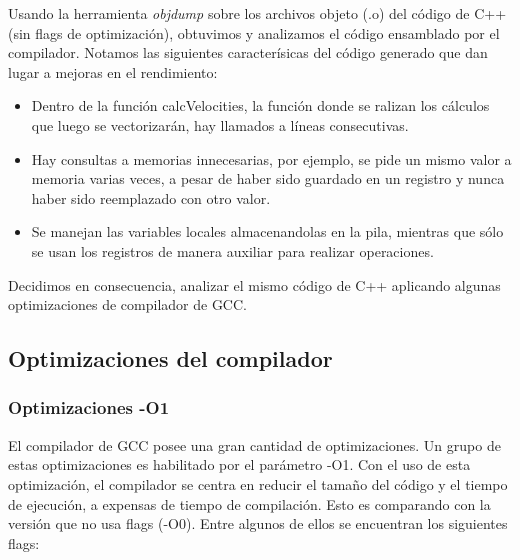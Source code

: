 Usando la herramienta \textit{objdump} sobre los archivos objeto (.o) del código de C++ (sin flags de optimización), obtuvimos y analizamos el código ensamblado por el compilador. Notamos las siguientes caracterísicas del código generado que dan lugar a mejoras en el rendimiento:
\begin{itemize}
	\item Dentro de la función calcVelocities, la función donde se ralizan los cálculos que luego se vectorizarán, hay llamados a líneas consecutivas.
	\item Hay consultas a memorias innecesarias, por ejemplo, se pide un mismo valor a memoria varias veces, a pesar de haber sido guardado en un registro y nunca haber sido reemplazado con otro valor.
	\item Se manejan las variables locales almacenandolas en la pila, mientras que sólo se usan los registros de manera auxiliar para realizar operaciones.
\end{itemize}
Decidimos en consecuencia, analizar el mismo código de C++ aplicando algunas optimizaciones de compilador de GCC.
~\\

\subsection{Optimizaciones del compilador}

\subsubsection{Optimizaciones -O1}
El compilador de GCC posee una gran cantidad de optimizaciones. Un grupo de estas optimizaciones es habilitado por el parámetro -O1. Con el uso de esta optimización, el compilador se centra en reducir el tamaño del código y el tiempo de ejecución, a expensas de tiempo de compilación. Esto es comparando con la versión que no usa flags (-O0). Entre algunos de ellos se encuentran los siguientes flags:

